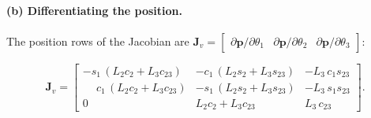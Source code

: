 \documentclass[11pt]{article}
\begin{document}
\paragraph{(b) Differentiating the position.} The position rows of the Jacobian are $\bm{J}_v=\begin{bmatrix}\partial\bm{p}/\partial\theta_1&\partial\bm{p}/\partial\theta_2&\partial\bm{p}/\partial\theta_3\end{bmatrix}$:
\begin{result}
\[
\bm{J}_v=\begin{bmatrix}
-s_1\,(L_2c_2+L_3c_{23}) & -c_1\,(L_2s_2+L_3s_{23}) & -L_3\,c_1s_{23}\\
\phantom{-}c_1\,(L_2c_2+L_3c_{23}) & -s_1\,(L_2s_2+L_3s_{23}) & -L_3\,s_1s_{23}\\
0 & L_2c_2+L_3c_{23} & L_3\,c_{23}
\end{bmatrix}.
\]
\end{result}
\end{document}
